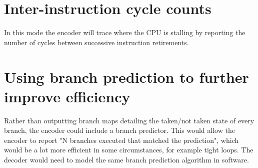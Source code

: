 \section{Inter-instruction cycle counts}

In this mode the encoder will trace where the CPU is stalling by
reporting the number of cycles between successive instruction
retirements.

\section{Using branch prediction to further improve efficiency}

Rather than outputting branch maps detailing the taken/not taken state of every branch,
the encoder could include a branch predictor.  This would allow the encoder to 
report "N branches executed that matched the prediction", which would be a lot more
efficient in some circumstances, for example tight loops.  The decoder would need to 
model the same branch prediction algorithm in software.
